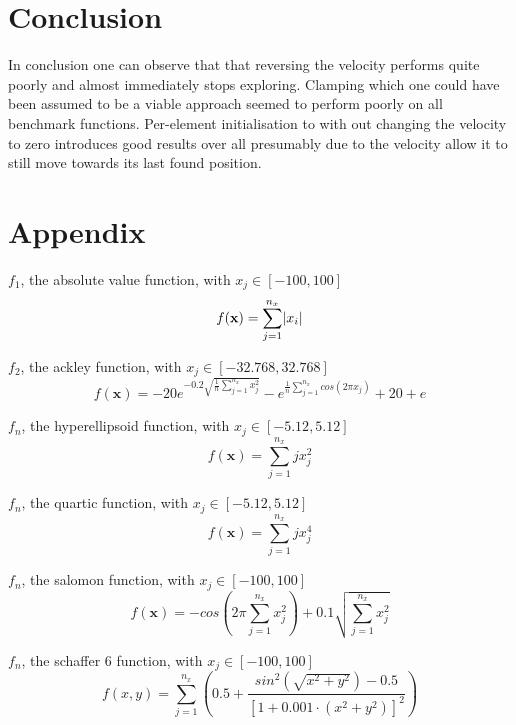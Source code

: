 \documentclass[conference]{IEEEtran}
\begin{document}
\newpage
\section{Conclusion}
In conclusion one can observe that that reversing the velocity performs quite poorly and almost immediately stops exploring. Clamping which one could have been assumed to be a viable approach seemed to perform poorly on all benchmark functions.
Per-element initialisation to with out changing the velocity to zero introduces good results over all presumably due to the velocity allow it to still move towards its last found position. 

\newpage

\nocite{*}
\noindent

\indent


\section{Appendix}

$f_1$, the absolute value function, with $x_j \in [-100, 100]$
\begin{equation} \label{eq:function:absolute}
    f(\mathbf{x}) = \sum_{j=1}^{n_x}{\abs{x_i}}
\end{equation} 


$f_2$, the ackley function, with $x_j \in [-32.768, 32.768]$
\begin{equation} \label{eq:function:ackley}
    f(\mathbf{x}) = -20e^{-0.2\sqrt{\frac{1}{n}\sum_{j=1}^{n_x}{x_j^2}}}-e^{\frac{1}{n}\sum_{j=1}^{n_x}{cos(2\pi x_j)}} + 20 + e
\end{equation}

$f_n$, the hyperellipsoid function, with $x_j \in [−5.12, 5.12]$
\begin{equation} \label{eq:function:hyperellipsoid}
    f(\mathbf{x}) = \sum_{j=1}^{n_x}{jx_j^2}
\end{equation}

$f_n$, the quartic function, with $x_j \in [−5.12, 5.12]$
\begin{equation} \label{eq:function:hyperellipsoid}
    f(\mathbf{x}) = \sum_{j=1}^{n_x}{jx_j^4}
\end{equation}

$f_n$, the salomon function, with $x_j \in [-100, 100]$
\begin{equation} \label{eq:function:salomon}
    f(\mathbf x)=-cos(2\pi\sum_{j=1}^{n_x}x_j^2)+0.1\sqrt{\sum_{j=1}^{n_x}x_j^2}
\end{equation}

$f_n$, the schaffer 6 function, with $x_j \in [-100, 100]$
\begin{equation} \label{eq:function:schafferf6}
    f(x,y)=\sum_{j=1}^{n_x}{\left(0.5+\frac{sin^2(\sqrt{x^2 + y^2})-0.5}{[1+0.001 \cdot (x^2 + y^2)]^2}\right)}
\end{equation}
\end{document}
